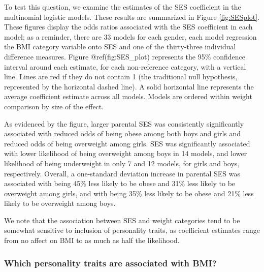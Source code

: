 \documentclass[man]{apa6}
\begin{document}
To test this question, we examine the estimates of the SES coefficient in the multinomial logistic models. These results are summarized in Figure \ref{fig:SESplot}. These figures display the odds ratios associated with the SES coefficient in each model; as a reminder, there are 33 models for each gender, each model regression the BMI category variable onto SES and one of the thirty-three individual difference measures. Figure @ref(fig:SES\_plot) represents the 95\% confidence interval around each estimate, for each non-reference category, with a vertical line. Lines are red if they do not contain 1 (the traditional null hypothesis, represented by the horizontal dashed line). A solid horizontal line represents the average coefficient estimate across all models. Models are ordered within weight comparison by size of the effect.

As evidenced by the figure, larger parental SES was consistently significantly associated with reduced odds of being obese among both boys and girls and reduced odds of being overweight among girls. SES was significantly associated with lower likelihood of being overweight among boys in 14 models, and lower likelihood of being underweight in only 7 and 12 models, for girls and boys, respectively. Overall, a one-standard deviation increase in parental SES was associated with being 45\% less likely to be obese and 31\% less likely to be overweight among girls, and with being 35\% less likely to be obese and 21\% less likely to be overweight among boys.

We note that the association between SES and weight categories tend to be somewhat sensitive to inclusion of personality traits, as coefficient estimates range from no affect on BMI to as much as half the likelihood.

\hypertarget{which-personality-traits-are-associated-with-bmi}{%
\subsubsection{Which personality traits are associated with BMI?}\label{which-personality-traits-are-associated-with-bmi}}
\end{document}
